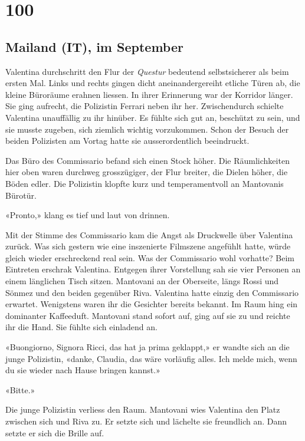 \chapter{100}

\section{Mailand (IT), im 
September}

Valentina durchschritt den Flur der \emph{Questur} bedeutend
selbstsicherer als beim ersten Mal. Links und rechts gingen dicht
aneinandergereiht etliche Türen ab, die kleine Büroräume erahnen
liessen. In ihrer Erinnerung war der Korridor länger. Sie ging aufrecht, die
Polizistin Ferrari neben ihr her. Zwischendurch schielte Valentina
unauffällig zu ihr hinüber. Es fühlte sich gut an, beschützt zu sein,
und sie musste zugeben, sich ziemlich wichtig vorzukommen. Schon der
Besuch der beiden Polizisten am Vortag hatte sie ausserordentlich
beeindruckt.

Das Büro des Commissario befand sich einen Stock höher. Die
Räumlichkeiten hier oben waren durchweg grosszügiger, der Flur breiter,
die Dielen höher, die Böden edler.
Die Polizistin klopfte kurz und temperamentvoll an Mantovanis Bürotür.

«Pronto,» klang es tief und laut von drinnen.

Mit der Stimme des Commissario kam die Angst als Druckwelle über
Valentina zurück. Was sich gestern wie eine inszenierte Filmszene
angefühlt hatte, würde gleich wieder erschreckend real sein. Was der
Commissario wohl vorhatte?
Beim Eintreten erschrak Valentina. Entgegen ihrer Vorstellung sah sie
vier Personen an einem länglichen Tisch sitzen. Mantovani an der
Oberseite, längs Rossi und Sönmez und den beiden gegenüber Riva.
Valentina hatte einzig den Commissario erwartet. Wenigstens waren ihr
die Gesichter bereits bekannt. Im Raum hing ein dominanter Kaffeeduft.
Mantovani stand sofort auf, ging auf sie zu und reichte ihr die Hand. Sie fühlte sich einladend an. 

«Buongiorno, Signora Ricci, das hat ja prima geklappt,» er wandte sich
an die junge Polizistin, «danke, Claudia, das wäre vorläufig alles. Ich
melde mich, wenn du sie wieder nach Hause bringen kannst.»

«Bitte.»

Die junge Polizistin verliess den Raum.
Mantovani wies Valentina den Platz zwischen sich und Riva zu. Er setzte sich und lächelte sie freundlich an. 
Dann setzte er sich die Brille auf.

